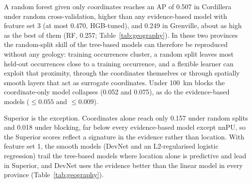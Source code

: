 \documentclass[pdflatex,sn-apa]{sn-jnl}
\begin{document}
A random forest given only coordinates reaches an AP of 0.507 in Cordillera under random cross-validation, higher than any evidence-based model with feature set 3 (at most 0.470, HGB-tuned), and 0.249 in Grenville, about as high as the best of them (RF, 0.257; Table~\ref{tab:geography}). In these two provinces the random-split skill of the tree-based models can therefore be reproduced without any geology: training occurrences cluster, a random split leaves most held-out occurrences close to a training occurrence, and a flexible learner can exploit that proximity, through the coordinates themselves or through spatially smooth layers that act as surrogate coordinates. Under 100~km blocks the coordinate-only model collapses (0.052 and 0.075), as do the evidence-based models ($\leq 0.055$ and $\leq 0.009$).

Superior is the exception. Coordinates alone reach only 0.157 under random splits and 0.018 under blocking, far below every evidence-based model except nnPU, so the Superior scores reflect a signature in the evidence rather than location. With feature set 1, the smooth models (DevNet and an L2-regularised logistic regression) trail the tree-based models where location alone is predictive and lead in Superior, and DevNet uses the evidence better than the linear model in every province (Table~\ref{tab:geography}).
\end{document}
